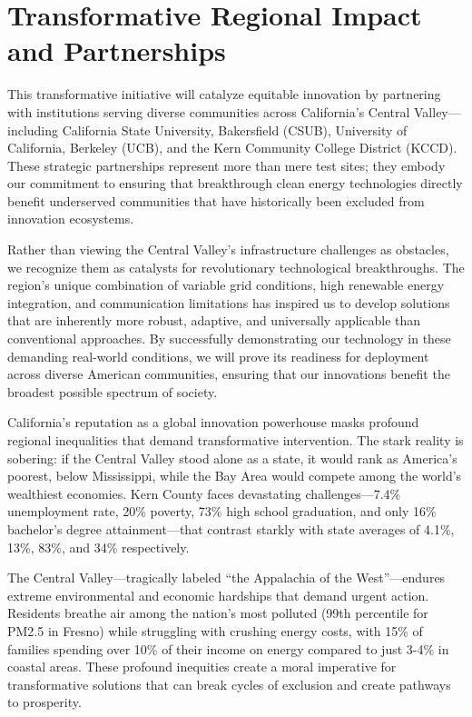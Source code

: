 \documentclass[12pt]{article}
\begin{document}
\section{Transformative Regional Impact and Partnerships}

This transformative initiative will catalyze equitable innovation by partnering with institutions serving diverse communities across California's Central Valley—including California State University, Bakersfield (CSUB), University of California, Berkeley (UCB), and the Kern Community College District (KCCD). These strategic partnerships represent more than mere test sites; they embody our commitment to ensuring that breakthrough clean energy technologies directly benefit underserved communities that have historically been excluded from innovation ecosystems.

Rather than viewing the Central Valley's infrastructure challenges as obstacles, we recognize them as catalysts for revolutionary technological breakthroughs. The region's unique combination of variable grid conditions, high renewable energy integration, and communication limitations has inspired us to develop solutions that are inherently more robust, adaptive, and universally applicable than conventional approaches. By successfully demonstrating our technology in these demanding real-world conditions, we will prove its readiness for deployment across diverse American communities, ensuring that our innovations benefit the broadest possible spectrum of society.

California's reputation as a global innovation powerhouse masks profound regional inequalities that demand transformative intervention. The stark reality is sobering: if the Central Valley stood alone as a state, it would rank as America's poorest, below Mississippi, while the Bay Area would compete among the world's wealthiest economies. Kern County faces devastating challenges—7.4\% unemployment rate, 20\% poverty, 73\% high school graduation, and only 16\% bachelor's degree attainment—that contrast starkly with state averages of 4.1\%, 13\%, 83\%, and 34\% respectively.

The Central Valley—tragically labeled ``the Appalachia of the West''—endures extreme environmental and economic hardships that demand urgent action. Residents breathe air among the nation's most polluted (99th percentile for PM2.5 in Fresno) while struggling with crushing energy costs, with 15\% of families spending over 10\% of their income on energy compared to just 3-4\% in coastal areas. These profound inequities create a moral imperative for transformative solutions that can break cycles of exclusion and create pathways to prosperity.
\end{document}

